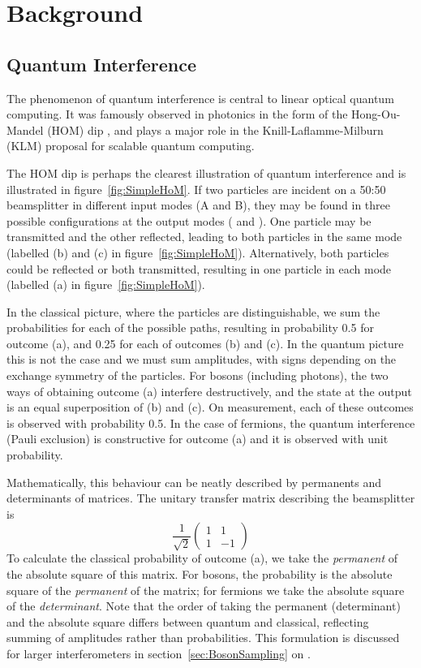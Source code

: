 \chapter{Background}
\label{ch:Background}
\section{Quantum Interference}
\label{sec:HOM}
The phenomenon of quantum interference is central to linear optical quantum
computing. It was famously observed in photonics in the form of the
Hong-Ou-Mandel (HOM) dip \cite{hom}, and plays a major role in the
Knill-Laflamme-Milburn (KLM) proposal for scalable quantum computing.

The HOM
dip is perhaps the clearest illustration of quantum interference and is
illustrated in figure~\ref{fig:SimpleHoM}. If two particles are incident on a
50:50 beamsplitter in different input modes (A and B), they may be found in
three possible configurations at the output modes (\aprime{} and \bprime{}). One
particle may be transmitted and the other reflected, leading to both particles
in the same mode (labelled (b) and (c) in figure~\ref{fig:SimpleHoM}).
Alternatively, both particles could be reflected or both transmitted, resulting
in one particle in each mode (labelled (a) in figure~\ref{fig:SimpleHoM}).

In the classical picture, where the particles are distinguishable, we sum the
probabilities for each of the possible paths, resulting in probability 0.5 for
outcome (a), and 0.25 for each of outcomes (b) and (c). In the quantum picture
this is not the case and we must sum amplitudes, with signs depending on the
exchange symmetry of the particles. For bosons (including photons), the two ways
of obtaining outcome (a) interfere destructively, and the state at the output is
an equal superposition of (b) and (c). On measurement, each of these outcomes is
observed with probability 0.5. In the case of fermions, the quantum interference
(Pauli exclusion) is constructive for outcome (a) and it is observed with unit
probability.

Mathematically, this behaviour can be neatly described by permanents and
determinants of matrices. The unitary transfer matrix describing the
beamsplitter is
\[ \frac{1}{\sqrt{2}} \begin{pmatrix} 1 & 1 \\ 1 & -1 \end{pmatrix} \]
To calculate the classical probability of outcome (a), we take the
\emph{permanent} of the absolute square of this matrix. For bosons, the
probability is the absolute square of the \emph{permanent} of the matrix; for
fermions we take the absolute square of the \emph{determinant}. Note that the
order of taking the permanent (determinant) and the absolute square differs
between quantum and classical, reflecting summing of amplitudes rather than
probabilities. This formulation is discussed for larger interferometers in
section~\ref{sec:BosonSampling} on \bosonsampling{}.

